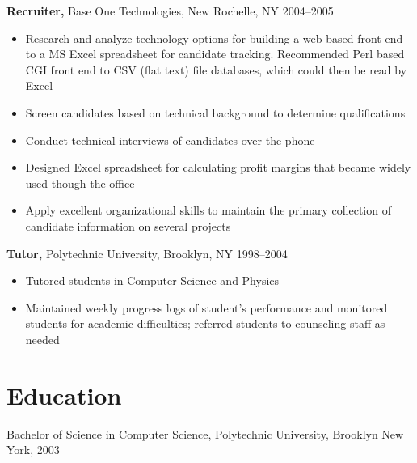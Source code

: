 \documentclass[margin]{res}
\begin{document}
\begin{resume}
{\bf Recruiter,} Base One Technologies, New Rochelle, NY \hfill 2004--2005
\begin{itemize}
  \item Research and analyze technology options for building a web based front end to a MS Excel spreadsheet for candidate tracking. Recommended Perl based CGI front end to CSV (flat text) file databases, which could then be read by Excel
  \item Screen candidates based on technical background to determine qualifications
  \item Conduct technical interviews of candidates over the phone
  \item Designed Excel spreadsheet for calculating profit margins that became widely used though the office
  \item Apply excellent organizational skills to maintain the primary collection of candidate information on several projects
\end{itemize}

{\bf Tutor,} Polytechnic University, Brooklyn, NY \hfill 1998--2004
\begin{itemize}
  \item Tutored students in Computer Science and Physics
  \item Maintained weekly progress logs of student’s performance and monitored students for academic difficulties; referred students to counseling staff as needed
\end{itemize}

\section{Education}
Bachelor of Science in Computer Science, Polytechnic University, Brooklyn New
York, 2003

\end{resume}
\end{document}

